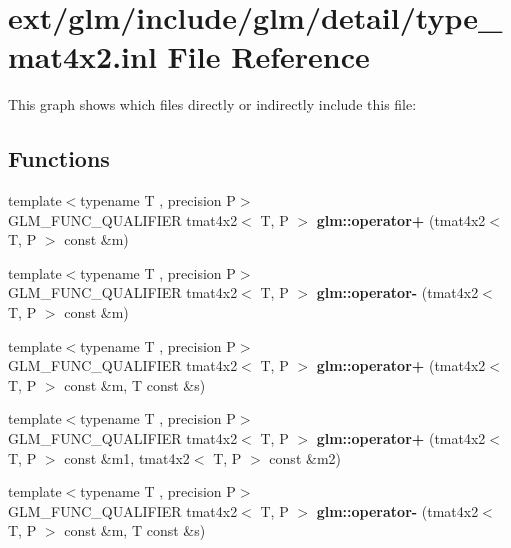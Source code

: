 \hypertarget{type__mat4x2_8inl}{\section{ext/glm/include/glm/detail/type\-\_\-mat4x2.inl File Reference}
\label{type__mat4x2_8inl}
}
This graph shows which files directly or indirectly include this file\-:
\subsection*{Functions}
\begin{DoxyCompactItemize}
\item 
\hypertarget{namespaceglm_a38915d7cca65c9dd9a221de7c0b6cae2}{{\footnotesize template$<$typename T , precision P$>$ }\\G\-L\-M\-\_\-\-F\-U\-N\-C\-\_\-\-Q\-U\-A\-L\-I\-F\-I\-E\-R tmat4x2$<$ T, P $>$ {\bfseries glm\-::operator+} (tmat4x2$<$ T, P $>$ const \&m)}\label{namespaceglm_a38915d7cca65c9dd9a221de7c0b6cae2}

\item 
\hypertarget{namespaceglm_ae1976eca7a3d1d7932449c25b1de40eb}{{\footnotesize template$<$typename T , precision P$>$ }\\G\-L\-M\-\_\-\-F\-U\-N\-C\-\_\-\-Q\-U\-A\-L\-I\-F\-I\-E\-R tmat4x2$<$ T, P $>$ {\bfseries glm\-::operator-\/} (tmat4x2$<$ T, P $>$ const \&m)}\label{namespaceglm_ae1976eca7a3d1d7932449c25b1de40eb}

\item 
\hypertarget{namespaceglm_ac8204cb27263b7da0271586d05a0b4ae}{{\footnotesize template$<$typename T , precision P$>$ }\\G\-L\-M\-\_\-\-F\-U\-N\-C\-\_\-\-Q\-U\-A\-L\-I\-F\-I\-E\-R tmat4x2$<$ T, P $>$ {\bfseries glm\-::operator+} (tmat4x2$<$ T, P $>$ const \&m, T const \&s)}\label{namespaceglm_ac8204cb27263b7da0271586d05a0b4ae}

\item 
\hypertarget{namespaceglm_a6b61c12b4e0452bcbce315424bc3d58a}{{\footnotesize template$<$typename T , precision P$>$ }\\G\-L\-M\-\_\-\-F\-U\-N\-C\-\_\-\-Q\-U\-A\-L\-I\-F\-I\-E\-R tmat4x2$<$ T, P $>$ {\bfseries glm\-::operator+} (tmat4x2$<$ T, P $>$ const \&m1, tmat4x2$<$ T, P $>$ const \&m2)}\label{namespaceglm_a6b61c12b4e0452bcbce315424bc3d58a}

\item 
\hypertarget{namespaceglm_a6410e8fc734abbc0679867a88b5707fb}{{\footnotesize template$<$typename T , precision P$>$ }\\G\-L\-M\-\_\-\-F\-U\-N\-C\-\_\-\-Q\-U\-A\-L\-I\-F\-I\-E\-R tmat4x2$<$ T, P $>$ {\bfseries glm\-::operator-\/} (tmat4x2$<$ T, P $>$ const \&m, T const \&s)}\label{namespaceglm_a6410e8fc734abbc0679867a88b5707fb}


\end{DoxyCompactItemize}
